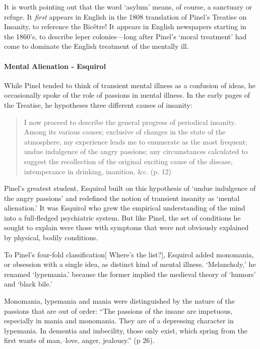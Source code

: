 It is worth pointing out that the word `asylum' means, of course, a sanctuary or refuge. It \emph{first} appears in English in the 1808 translation of Pinel's Treatise on Insanity, to reference the Bicêtre! It appears in English newspapers starting in the 1860's, to describe leper colonies---long after Pinel's `moral treatment' had come to dominate the English treatment of the mentally ill.

\paragraph{Mental Alienation - Esquirol}
\label{mentalalienation-esquirol}

While Pinel tended to think of transient mental illness as a confusion of ideas, he occasionally spoke of the role of passions in mental illness. In the early pages of the Treatise, he hypotheses three different causes of insanity:

\begin{quote}

I now proceed to describe the general progress of periodical insanity. Among its various causes; exclusive of changes in the state of the atmosphere, my experience leads me to enumerate as the most frequent; undue indulgence of the angry passions; any circumstances calculated to suggest the recollection of the original exciting cause of the disease, intemperance in drinking, inanition, \&c. (p. 12)
\end{quote}

Pinel's greatest student, Esquirol built on this hypothesis of `undue indulgence of the angry passions' and redefined the notion of transient insanity as `mental alienation.' It was Esquirol who grew the empirical understanding of the mind into a full-fledged psychiatric system. But like Pinel, the set of conditions he sought to explain were those with symptoms that were not obviously explained by physical, bodily conditions.

To Pinel's four-fold classification[ Where's the list?], Esquirol added monomania, or obsession with a single idea, as distinct kind of mental illness. `Melancholy,' he renamed `lypemania.' because the former implied the medieval theory of `humors' and `black bile.' 

Monomania, lypemania and mania were distinguished by the nature of the passions that are out of order: ``The passions of the insane are impetuous, especially in mania and monomania. They are of a depressing character in lypemania. In dementia and imbecility, those only exist, which spring from the first wants of man,--love, anger, jealousy.'' (p 26). 

